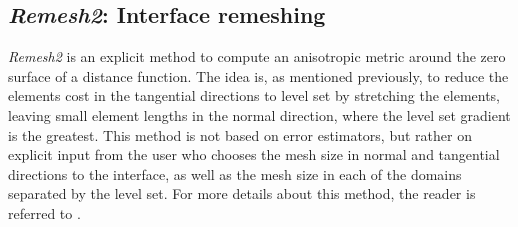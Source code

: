 \subsection{\emph{Remesh2}: Interface remeshing} \label{sec:remesh2_params}

\emph{Remesh2} is an explicit method to compute an anisotropic metric around the zero surface of a distance function.
The idea is, as mentioned previously, to reduce the elements cost in the tangential directions to level set by
stretching the elements, leaving small element lengths in the normal direction, where the level set gradient is the greatest.
This method is not based on error estimators, but rather on explicit input from the user who chooses the mesh size in
normal and tangential directions to the interface, as well as the mesh size in each of the domains separated by the level set.
For more details about this method, the reader is referred to \citep{bernacki_development_2007,resk_adaptive_2009,roux_level-set_2013}.


